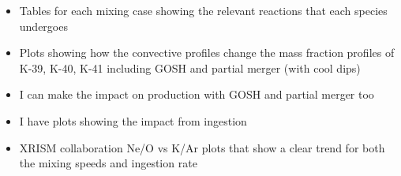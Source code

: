 \begin{itemize}
    \item Tables for each mixing case showing the relevant reactions that each species undergoes
    \item Plots showing how the convective profiles change the mass fraction profiles of K-39, K-40, K-41 including GOSH and partial merger (with cool dips)
    \item I can make the impact on production with GOSH and partial merger too
    \item I have plots showing the impact from ingestion
    \item XRISM collaboration Ne/O vs K/Ar plots that show a clear trend for both the mixing speeds and ingestion rate
\end{itemize}